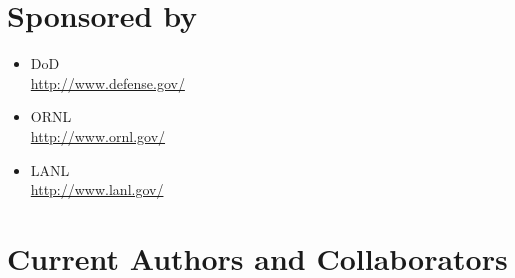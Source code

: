 \pagebreak{}

\section*{Sponsored by}
\begin{itemize}
\item \ac{DoD}\\
  \url{http://www.defense.gov/ }
\item \ac{ORNL}\\
  \url{http://www.ornl.gov/}
\item \ac{LANL}\\
  \url{http://www.lanl.gov/}
\end{itemize}

\section*{Current Authors and Collaborators}
